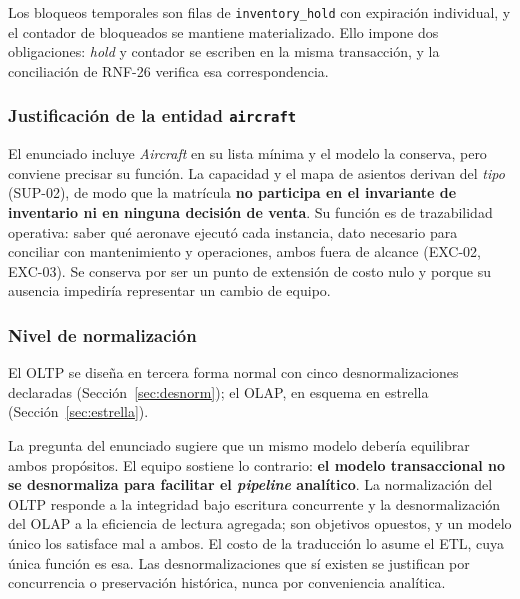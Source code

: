 \documentclass[10pt,letterpaper]{article}
\begin{document}
Los bloqueos temporales son filas de \texttt{inventory\_hold} con expiración individual, y el contador de bloqueados se mantiene materializado. Ello impone dos obligaciones: \emph{hold} y contador se escriben en la misma transacción, y la conciliación de RNF-26 verifica esa correspondencia.

\subsubsection{Justificación de la entidad \texttt{aircraft}}
El enunciado incluye \emph{Aircraft} en su lista mínima y el modelo la conserva, pero conviene precisar su función. La capacidad y el mapa de asientos derivan del \emph{tipo} (SUP-02), de modo que la matrícula \textbf{no participa en el invariante de inventario ni en ninguna decisión de venta}. Su función es de trazabilidad operativa: saber qué aeronave ejecutó cada instancia, dato necesario para conciliar con mantenimiento y operaciones, ambos fuera de alcance (EXC-02, EXC-03). Se conserva por ser un punto de extensión de costo nulo y porque su ausencia impediría representar un cambio de equipo.

\subsubsection{Nivel de normalización}
El OLTP se diseña en tercera forma normal con cinco desnormalizaciones declaradas (Sección~\ref{sec:desnorm}); el OLAP, en esquema en estrella (Sección~\ref{sec:estrella}).

La pregunta del enunciado sugiere que un mismo modelo debería equilibrar ambos propósitos. El equipo sostiene lo contrario: \textbf{el modelo transaccional no se desnormaliza para facilitar el \emph{pipeline} analítico}. La normalización del OLTP responde a la integridad bajo escritura concurrente y la desnormalización del OLAP a la eficiencia de lectura agregada; son objetivos opuestos, y un modelo único los satisface mal a ambos. El costo de la traducción lo asume el ETL, cuya única función es esa. Las desnormalizaciones que sí existen se justifican por concurrencia o preservación histórica, nunca por conveniencia analítica.
\end{document}
